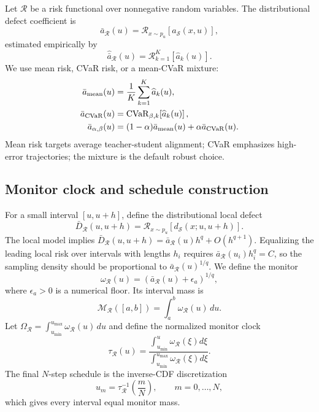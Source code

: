Let $\mathcal R$ be a risk functional over nonnegative random variables. The
distributional defect coefficient is
\begin{equation}
  \bar a_{\mathcal R}(u)
  =
  \mathcal R_{x\sim p_u}\!\left[a_{\mathcal S}(x,u)\right],
  \label{eq:distributional-a}
\end{equation}
estimated empirically by
\begin{equation}
  \widehat{\bar a}_{\mathcal R}(u)
  =
  \mathcal R_{k=1}^K\!\left[\widehat a_k(u)\right].
\end{equation}
We use mean risk, CVaR risk, or a mean-CVaR mixture:
\begin{align}
  \bar a_{\rm mean}(u)
  &=\frac{1}{K}\sum_{k=1}^K\widehat a_k(u),\\
  \bar a_{\rm CVaR}(u)
  &=\operatorname{CVaR}_{\beta,k}\!\left[\widehat a_k(u)\right],\\
  \bar a_{\alpha,\beta}(u)
  &=(1-\alpha)\bar a_{\rm mean}(u)+\alpha\bar a_{\rm CVaR}(u).
\end{align}
Mean risk targets average teacher-student alignment; CVaR emphasizes
high-error trajectories; the mixture is the default robust choice.

\subsection{Monitor clock and schedule construction}

For a small interval $[u,u+h]$, define the distributional local defect
\begin{equation}
  \bar D_{\mathcal R}(u,u+h)
  =
  \mathcal R_{x\sim p_u}\!\left[d_{\mathcal S}(x;u,u+h)\right].
\end{equation}
The local model implies
$\bar D_{\mathcal R}(u,u+h)=\bar a_{\mathcal R}(u)h^q+O(h^{q+1})$. Equalizing
the leading local risk over intervals with lengths $h_i$ requires
$\bar a_{\mathcal R}(u_i)h_i^q=C$, so the sampling density should be
proportional to $\bar a_{\mathcal R}(u)^{1/q}$. We define the monitor
\begin{equation}
  \omega_{\mathcal R}(u)
  =
  \left(\bar a_{\mathcal R}(u)+\epsilon_a\right)^{1/q},
  \label{eq:monitor}
\end{equation}
where $\epsilon_a>0$ is a numerical floor. Its interval mass is
\begin{equation}
  \mathcal M_{\mathcal R}([a,b])
  =
  \int_a^b\omega_{\mathcal R}(u)\,du.
\end{equation}
Let $\Omega_{\mathcal R}=\int_{u_{\min}}^{u_{\max}}\omega_{\mathcal R}(u)\,du$
and define the normalized monitor clock
\begin{equation}
  \tau_{\mathcal R}(u)
  =
  \frac{\int_{u_{\min}}^u\omega_{\mathcal R}(\xi)d\xi}
  {\int_{u_{\min}}^{u_{\max}}\omega_{\mathcal R}(\xi)d\xi}.
  \label{eq:monitor-clock}
\end{equation}
The final $N$-step schedule is the inverse-CDF discretization
\begin{equation}
  u_m=\tau_{\mathcal R}^{-1}\!\left(\frac{m}{N}\right),
  \qquad m=0,\ldots,N,
  \label{eq:inverse-cdf-schedule}
\end{equation}
which gives every interval equal monitor mass.

